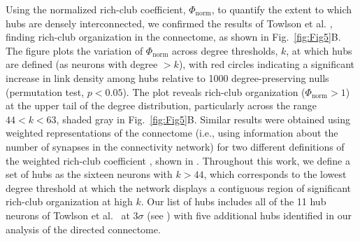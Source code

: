 \documentclass[10pt,letterpaper]{article}
\begin{document}
Using the normalized rich-club coefficient, $\Phi_\mathrm{norm}$, to quantify the extent to which hubs are densely interconnected, we confirmed the results of Towlson et al. \cite{Towlson2013}, finding rich-club organization in the connectome, as shown in Fig.~\ref{fig:Fig5}B.
The figure plots the variation of $\Phi_\mathrm{norm}$ across degree thresholds, $k$, at which hubs are defined (as neurons with degree $>k$), with red circles indicating a significant increase in link density among hubs relative to 1000 degree-preserving nulls (permutation test, $p < 0.05$).
The plot reveals rich-club organization ($\Phi_\mathrm{norm} > 1$) at the upper tail of the degree distribution, particularly across the range $44 < k < 63$, shaded gray in Fig.~\ref{fig:Fig5}B.
Similar results were obtained using weighted representations of the connectome (i.e., using information about the number of synapses in the connectivity network) for two different definitions of the weighted rich-club coefficient \cite{Opsahl2008}, shown in .
Throughout this work, we define a set of hubs as the sixteen neurons with $k > 44$, which corresponds to the lowest degree threshold at which the network displays a contiguous region of significant rich-club organization at high $k$.
Our list of hubs includes all of the 11 hub neurons of Towlson et al.~\cite{Towlson2013} at $3 \sigma$ (see ) with five additional hubs identified in our analysis of the directed connectome.
\end{document}
